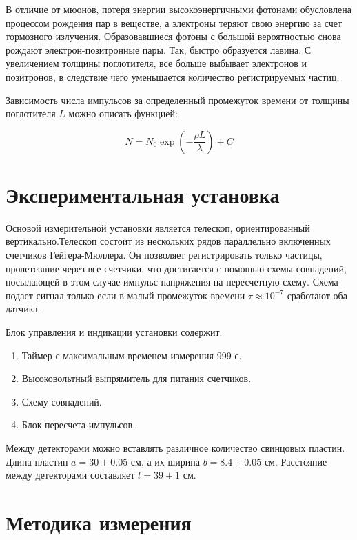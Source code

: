 \documentclass[reprint, nofootinbib, nobalancelastpage, 10pt]{revtex4-2}
\begin{document}
В отличие от мюонов, потеря энергии высокоэнергичными фотонами обусловлена процессом
рождения пар в веществе, а электроны теряют свою энергию за счет тормозного излучения.
Образовавшиеся фотоны с большой вероятностью снова рождают электрон-позитронные пары.
Так, быстро образуется лавина. С увеличением толщины поглотителя, все больше выбывает
электронов и позитронов, в следствие чего уменьшается количество регистрируемых частиц. 

Зависимость числа импульсов за определенный промежуток времени от толщины поглотителя $L$
можно описать функцией:

\begin{equation}
	\label{eq:expon}
	N = N_0 \exp \left(-\dfrac{\rho L}{\lambda} \right) + C
\end{equation}

\section*{Экспериментальная установка}

Основой измерительной установки является телескоп, ориентированный вертикально.Телескоп
состоит из нескольких рядов параллельно включенных счетчиков Гейгера-Мюллера. Он позволяет
регистрировать только частицы, пролетевшие через все счетчики, что достигается с помощью
схемы совпадений, посылающей в этом случае импульс напряжения на пересчетную схему.
Схема подает сигнал только если в малый промежуток времени $\tau \approx 10^{-7}$
сработают оба датчика.

Блок управления и индикации установки содержит:

\begin{enumerate}
	\item Таймер с максимальным временем измерения 999 с.
	\item Высоковольтный выпрямитель для питания счетчиков.
	\item Схему совпадений.
	\item Блок пересчета импульсов.
\end{enumerate}

Между детекторами можно вставлять различное количество свинцовых пластин. Длина пластин
$a = 30 \pm 0.05$ см, а их ширина $b = 8.4 \pm 0.05$ см. Расстояние между детекторами
составляет $l = 39 \pm 1$ см.

\section*{Методика измерения}
\end{document}
